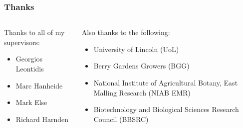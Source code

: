 \documentclass[aspectratio=169]{beamer}
\begin{document}
  \begin{frame}
    \frametitle{Thanks}
    \begin{columns}
      \begin{column}{0.5\textwidth}
        Thanks to all of my supervisors:
        \begin{itemize}
          \item Georgios Leontidis
          \item Marc Hanheide
          \item Mark Else
          \item Richard Harnden
        \end{itemize}
      \end{column}
      \begin{column}{0.5\textwidth}
        Also thanks to the following:
        \begin{itemize}
          \item University of Lincoln (UoL)
          \item Berry Gardens Growers (BGG)
          \item National Institute of Agricultural Botany, East Malling Research (NIAB EMR)
          \item Biotechnology and Biological Sciences Research Council (BBSRC)
        \end{itemize}
      \end{column}
    \end{columns}
  \end{frame}
\end{document}
